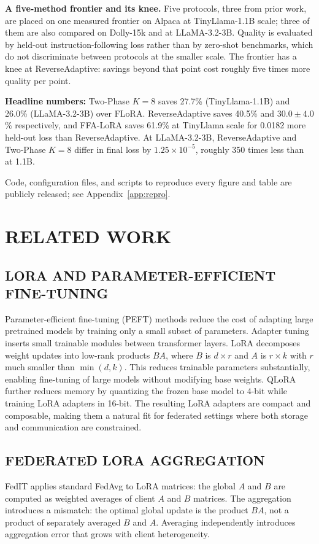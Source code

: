 \textbf{A five-method frontier and its knee.}
Five protocols, three from prior work, are placed on one measured frontier on Alpaca at TinyLlama-1.1B scale; three of them are also compared on Dolly-15k and at LLaMA-3.2-3B. Quality is evaluated by held-out instruction-following loss rather than by zero-shot benchmarks, which do not discriminate between protocols at the smaller scale. The frontier has a knee at ReverseAdaptive: savings beyond that point cost roughly five times more quality per point.

\textbf{Headline numbers:}
Two-Phase $K{=}8$ saves 27.7\% (TinyLlama-1.1B) and 26.0\% (LLaMA-3.2-3B) over FLoRA. ReverseAdaptive saves 40.5\% and $30.0 \pm 4.0$\% respectively, and FFA-LoRA saves 61.9\% at TinyLlama scale for 0.0182 more held-out loss than ReverseAdaptive. At LLaMA-3.2-3B, ReverseAdaptive and Two-Phase $K{=}8$ differ in final loss by $1.25 \times 10^{-5}$, roughly 350 times less than at 1.1B.

Code, configuration files, and scripts to reproduce every figure and table are publicly released; see Appendix~\ref{app:repro}.

\section{RELATED WORK}
\label{sec:related}

\subsection{LORA AND PARAMETER-EFFICIENT FINE-TUNING}
Parameter-efficient fine-tuning (PEFT) methods reduce the cost of adapting large pretrained models by training only a small subset of parameters. Adapter tuning \cite{houlsby2019parameter} inserts small trainable modules between transformer layers. LoRA \cite{hu2022lora} decomposes weight updates into low-rank products $BA$, where $B$ is $d \times r$ and $A$ is $r \times k$ with $r$ much smaller than $\min(d,k)$. This reduces trainable parameters substantially, enabling fine-tuning of large models without modifying base weights. QLoRA \cite{dettmers2023qlora} further reduces memory by quantizing the frozen base model to 4-bit while training LoRA adapters in 16-bit. The resulting LoRA adapters are compact and composable, making them a natural fit for federated settings where both storage and communication are constrained.

\subsection{FEDERATED LORA AGGREGATION}
FedIT \cite{zhang2024federatedgpt} applies standard FedAvg \cite{mcmahan2017communication} to LoRA matrices: the global $A$ and $B$ are computed as weighted averages of client $A$ and $B$ matrices. The aggregation introduces a mismatch: the optimal global update is the product $BA$, not a product of separately averaged $B$ and $A$. Averaging independently introduces aggregation error that grows with client heterogeneity.


